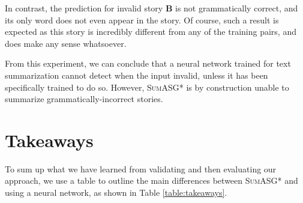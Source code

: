 In contrast, the prediction for invalid story \textbf{B} is not grammatically correct, and its only word does not even appear in the story. Of course, such a result is expected as this story is incredibly different from any of the training pairs, and does make any sense whatsoever.

From this experiment, we can conclude that a neural network trained for text summarization cannot detect when the input invalid, unless it has been specifically trained to do so. However, \textsc{SumASG*} is by construction unable to summarize grammatically-incorrect stories.

\section{Takeaways}
\label{sec:evaluation_takeaways}

To sum up what we have learned from validating and then evaluating our approach, we use a table to outline the main differences between \textsc{SumASG*} and using a neural network, as shown in Table \ref{table:takeaways}.

